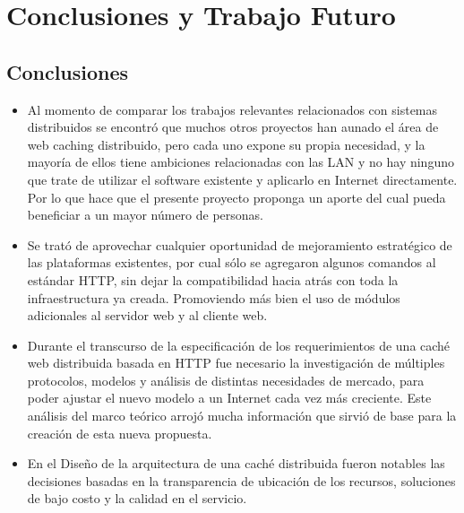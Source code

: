
\chapter{Conclusiones y Trabajo Futuro} %

\label{ch:conclusiones} %


\section{Conclusiones}

\begin{itemize}
\item  Al momento de comparar los trabajos relevantes relacionados con sistemas distribuidos se encontró que muchos otros proyectos han aunado el área de web caching distribuido, pero cada uno expone su propia necesidad, y la mayoría de ellos tiene ambiciones relacionadas con las LAN y no hay ninguno que trate de utilizar el software existente y aplicarlo en Internet directamente. Por lo que hace que el presente proyecto proponga un aporte del cual pueda beneficiar a un mayor número de personas. 

\item Se trató de aprovechar cualquier oportunidad de mejoramiento estratégico de las plataformas existentes, por cual sólo se agregaron algunos comandos al estándar HTTP, sin dejar la compatibilidad hacia atrás con toda la infraestructura ya creada. Promoviendo más bien el uso de módulos adicionales al servidor web y al cliente web.

\item Durante el transcurso de la especificación de los requerimientos de una caché web distribuida basada en HTTP fue necesario la investigación de múltiples protocolos, modelos y análisis de distintas necesidades de mercado, para poder ajustar el nuevo modelo a un Internet cada vez más creciente. Este análisis del marco teórico arrojó mucha información que sirvió de base para la creación de esta nueva propuesta.

\item En el Diseño de la arquitectura de una caché distribuida fueron notables las decisiones basadas en la transparencia de ubicación de los recursos, soluciones de bajo costo y la calidad en el servicio. 


\end{itemize}
